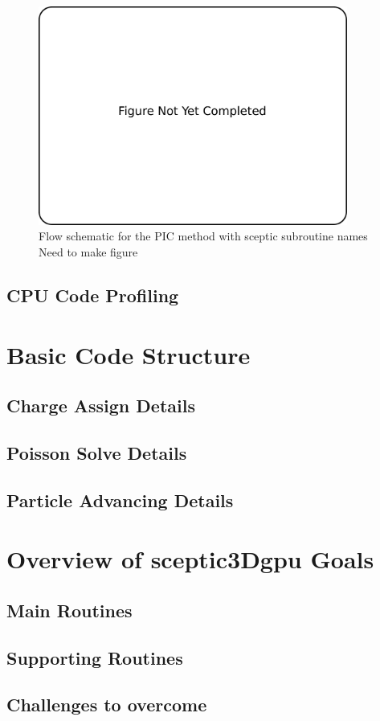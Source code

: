 \begin{figure}
\begin{center}
\includegraphics[width=4in]{introduction/not_finished.pdf}
\end{center}
\caption{Flow schematic for the PIC method with sceptic subroutine names Need to make figure}
\label{fig:pic_flowchart_sceptic}
\end{figure}

	\subsection{CPU Code Profiling}

		\section{Basic Code Structure}

		
		\subsection{Charge Assign Details}
		
		\subsection{Poisson Solve Details}
		
		\subsection{Particle Advancing Details}
		

		

	\section{Overview of sceptic3Dgpu Goals}

		\subsection{Main Routines}

		\subsection{Supporting Routines}

		\subsection{Challenges to overcome}
















